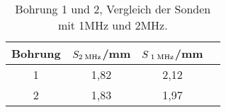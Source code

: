 \begin{table}[H]
  \centering
  \caption{Bohrung 1 und 2, Vergleich der Sonden mit 1\;MHz und 2\;MHz.}
  \label{tab:tab5}
    \begin{tabular}{c c c c}
    \toprule
    Bohrung & $S_{\text{2\;MHz}}$/\;mm & $S_{\text{ 1\;MHz}}$/\;mm\\
    \midrule
    1 & 1,82 & 2,12\\
    2 & 1,83 & 1,97\\
    \bottomrule
    \end{tabular}
  \end{table}
